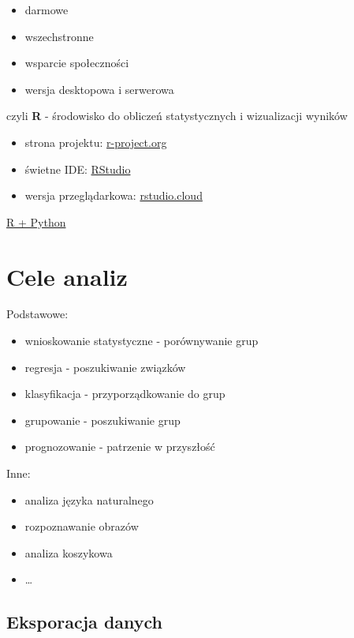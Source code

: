 \documentclass[]{book}
\providecommand{\tightlist}{%
  \setlength{\itemsep}{0pt}\setlength{\parskip}{0pt}}
\begin{document}
\begin{itemize}
\tightlist
\item
  darmowe
\item
  wszechstronne
\item
  wsparcie społeczności
\item
  wersja desktopowa i serwerowa
\end{itemize}

czyli \textbf{R} - środowisko do obliczeń statystycznych i wizualizacji wyników

\begin{itemize}
\tightlist
\item
  strona projektu: \href{https://www.r-project.org/}{r-project.org}
\item
  świetne IDE: \href{https://www.rstudio.com/}{RStudio}
\item
  wersja przeglądarkowa: \href{https://rstudio.cloud/}{rstudio.cloud}
\end{itemize}

\href{https://www.business-science.io/business/2018/10/08/python-and-r.html}{R + Python}

\hypertarget{cele-analiz}{%
\section{Cele analiz}\label{cele-analiz}}

Podstawowe:

\begin{itemize}
\tightlist
\item
  wnioskowanie statystyczne - porównywanie grup
\item
  regresja - poszukiwanie związków
\item
  klasyfikacja - przyporządkowanie do grup
\item
  grupowanie - poszukiwanie grup
\item
  prognozowanie - patrzenie w przyszłość
\end{itemize}

Inne:

\begin{itemize}
\tightlist
\item
  analiza języka naturalnego
\item
  rozpoznawanie obrazów
\item
  analiza koszykowa
\item
  \ldots{}
\end{itemize}

\hypertarget{eksporacja-danych}{%
\subsection{Eksporacja danych}\label{eksporacja-danych}}
\end{document}
